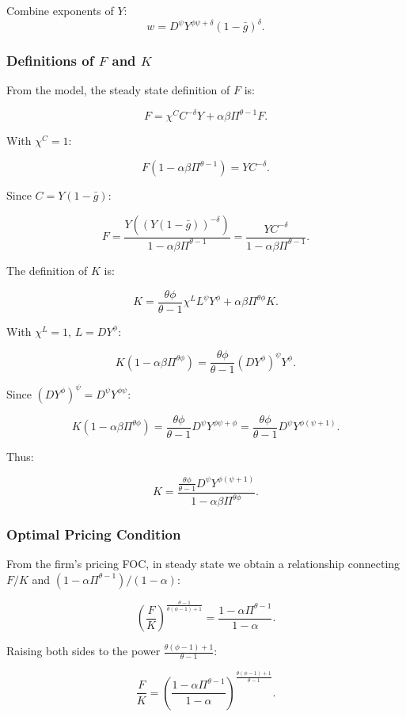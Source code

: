 \documentclass[12pt]{article}
\begin{document}
Combine exponents of $Y$:
\[
w = D^\psi Y^{\phi \psi + \delta}(1-\bar{g})^\delta.
\]


\subsubsection{Definitions of $F$ and $K$}

From the model, the steady state definition of $F$ is:

\[
F = \chi^C C^{-\delta}Y + \alpha\beta\Pi^{\theta-1}F.
\]

With $\chi^C=1$:

\[
F(1-\alpha\beta \Pi^{\theta-1})= Y C^{-\delta}.
\]

Since $C=Y(1-\bar{g})$:

\[
F = \frac{Y( (Y(1-\bar{g}))^{-\delta})}{1-\alpha\beta \Pi^{\theta-1}} = \frac{Y C^{-\delta}}{1-\alpha\beta\Pi^{\theta-1}}.
\]

The definition of $K$ is:

\[
K = \frac{\theta\phi}{\theta-1}\chi^L L^\psi Y^\phi + \alpha\beta \Pi^{\theta\phi}K.
\]

With $\chi^L=1$, $L=DY^\phi$:

\[
K(1-\alpha\beta\Pi^{\theta\phi}) = \frac{\theta\phi}{\theta-1}(DY^\phi)^\psi Y^\phi.
\]

Since $(DY^\phi)^\psi = D^\psi Y^{\phi\psi}$:

\[
K(1-\alpha\beta\Pi^{\theta\phi}) = \frac{\theta\phi}{\theta-1}D^\psi Y^{\phi\psi+\phi} = \frac{\theta\phi}{\theta-1}D^\psi Y^{\phi(\psi+1)}.
\]

Thus:

\[
K = \frac{\frac{\theta\phi}{\theta-1}D^\psi Y^{\phi(\psi+1)}}{1-\alpha\beta\Pi^{\theta\phi}}.
\]


\subsubsection{Optimal Pricing Condition}

From the firm's pricing FOC, in steady state we obtain a relationship connecting $F/K$ and $(1-\alpha \Pi^{\theta-1})/(1-\alpha)$:

\[
\left(\frac{F}{K}\right)^{\frac{\theta-1}{\theta(\phi-1)+1}} = \frac{1-\alpha\Pi^{\theta-1}}{1-\alpha}.
\]

Raising both sides to the power $\frac{\theta(\phi-1)+1}{\theta-1}$:

\[
\frac{F}{K} = \left(\frac{1-\alpha\Pi^{\theta-1}}{1-\alpha}\right)^{\frac{\theta(\phi-1)+1}{\theta-1}}.
\]
\end{document}
